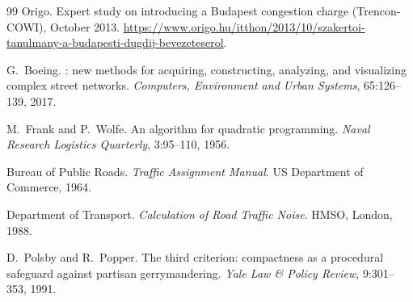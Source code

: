 \documentclass[11pt,a4paper]{article}
\begin{document}
\begin{thebibliography}{99}
Origo.
\newblock Expert study on introducing a Budapest congestion charge (Trencon-COWI), October 2013.
\newblock \url{https://www.origo.hu/itthon/2013/10/szakertoi-tanulmany-a-budapesti-dugdij-bevezeteserol}.

G.~Boeing.
: new methods for acquiring, constructing, analyzing, and visualizing complex street networks.
\newblock \emph{Computers, Environment and Urban Systems}, 65:126--139, 2017.

M.~Frank and P.~Wolfe.
\newblock An algorithm for quadratic programming.
\newblock \emph{Naval Research Logistics Quarterly}, 3:95--110, 1956.

Bureau of Public Roads.
\newblock \emph{Traffic Assignment Manual}.
\newblock US Department of Commerce, 1964.

Department of Transport.
\newblock \emph{Calculation of Road Traffic Noise}.
\newblock HMSO, London, 1988.

D.~Polsby and R.~Popper.
\newblock The third criterion: compactness as a procedural safeguard against partisan gerrymandering.
\newblock \emph{Yale Law \& Policy Review}, 9:301--353, 1991.

\end{thebibliography}
\end{document}
